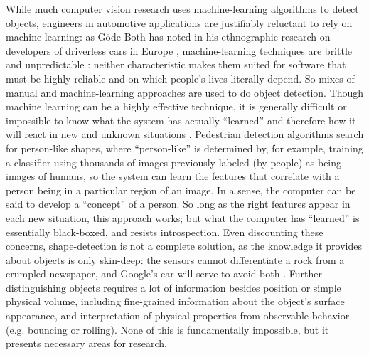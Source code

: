
While much computer vision research uses machine-learning algorithms to detect
objects, engineers in automotive applications are justifiably
reluctant to rely on machine-learning: as G\"{o}de Both has noted in his
ethnographic research on developers of driverless cars in
Europe \cite{bothpt1},
machine-learning techniques are brittle and unpredictable \cite{bothpt2}: neither
characteristic makes them suited for software that must be highly
reliable and on which people's lives literally depend. So mixes of
manual and machine-learning approaches are used to do object
detection. Though machine learning can be a highly effective
technique, it is generally difficult or impossible to know what the
system has actually ``learned'' and therefore how it will react in new
and unknown situations \cite{bothpt2}. Pedestrian detection algorithms search for
person-like shapes, where
``person-like'' is determined by, for example, training a classifier
using thousands of images previously labeled (by people) as being images of humans, so
the system can learn the features that correlate with a person being
in a particular region of an image. In a sense, the computer can be
said to develop
a ``concept'' of a person. So long as the right features appear in each
new situation, this approach works; but what the computer has
``learned'' is essentially black-boxed, and resists introspection.
Even discounting these concerns, shape-detection is not a complete
solution, as the knowledge it provides about objects is only
skin-deep: the sensors cannot differentiate a rock from a crumpled
newspaper, and Google's car will serve to avoid
both \cite{gomesCircles}. Further distinguishing objects requires a lot
of information besides position or simple physical volume,
including fine-grained information about the object's surface
appearance, and interpretation of physical properties from observable
behavior (e.g. bouncing or rolling). None of this is fundamentally
impossible, but it presents necessary areas for research.

